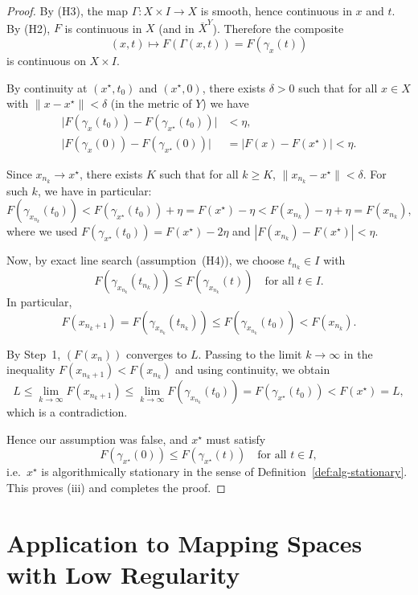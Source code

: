 \documentclass{amsart}
\newcounter{thm}
\newcounter{ex}
\newcounter{re}
\begin{document}
{\begin{proof}
By (H3), the map $\Gamma : X\times I\to X$ is smooth, hence continuous in $x$ and $t$.
By (H2), $F$ is continuous in $X$ (and in $\overline{X}^Y$). Therefore the composite
\[
(x,t) \longmapsto F(\Gamma(x,t)) = F(\gamma_x(t))
\]
is continuous on $X\times I$.

By continuity at $(x^\star,t_0)$ and $(x^\star,0)$, there exists $\delta>0$ such that
for all $x\in X$ with $\|x - x^\star\| < \delta$ (in the metric of $Y$) we have
\begin{align*}
\bigl|F(\gamma_x(t_0)) - F(\gamma_{x^\star}(t_0))\bigr| &< \eta,\\
\bigl|F(\gamma_x(0)) - F(\gamma_{x^\star}(0))\bigr| &= \bigl|F(x) - F(x^\star)\bigr| < \eta.
\end{align*}

Since $x_{n_k}\to x^\star$, there exists $K$ such that for all $k\geq K$,
$\|x_{n_k} - x^\star\| < \delta$. For such $k$, we have in particular:
\[
F(\gamma_{x_{n_k}}(t_0)) 
< F(\gamma_{x^\star}(t_0)) + \eta
= F(x^\star) - \eta
< F(x_{n_k}) - \eta + \eta
= F(x_{n_k}),
\]
where we used $F(\gamma_{x^\star}(t_0)) = F(x^\star) - 2\eta$ and 
$|F(x_{n_k}) - F(x^\star)|<\eta$.

Now, by exact line search (assumption~(H4)), we choose $t_{n_k}\in I$ with
\[
F(\gamma_{x_{n_k}}(t_{n_k})) \leq F(\gamma_{x_{n_k}}(t)) \quad \text{for all } t\in I.
\]
In particular,
\[
F(x_{n_k+1}) = F(\gamma_{x_{n_k}}(t_{n_k})) \leq F(\gamma_{x_{n_k}}(t_0)) < F(x_{n_k}).
\]

By Step~1, $(F(x_n))$ converges to $L$. Passing to the limit $k\to\infty$ in the
inequality $F(x_{n_k+1}) < F(x_{n_k})$ and using continuity, we obtain
\[
L \leq \lim_{k\to\infty} F(x_{n_k+1})
\leq \lim_{k\to\infty} F(\gamma_{x_{n_k}}(t_0))
= F(\gamma_{x^\star}(t_0))
< F(x^\star) = L,
\]
which is a contradiction.

Hence our assumption was false, and $x^\star$ must satisfy
\[
F(\gamma_{x^\star}(0)) \leq F(\gamma_{x^\star}(t)) \quad \text{for all } t\in I,
\]
i.e.\ $x^\star$ is algorithmically stationary in the sense of
Definition~\ref{def:alg-stationary}.  This proves (iii) and completes the proof.
\end{proof}


}



\section{Application to Mapping Spaces with Low Regularity}
\end{document}
